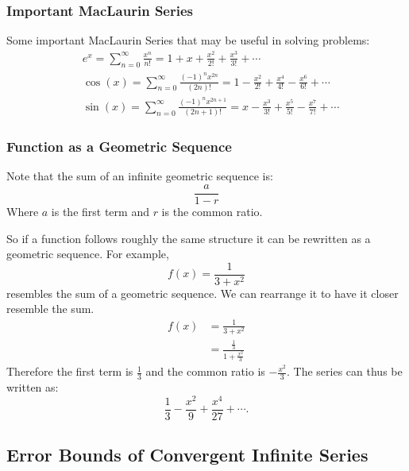 \documentclass[12pt]{article}
\begin{document}
\subsubsection{Important MacLaurin Series}
\noindent Some important MacLaurin Series that may be useful in solving problems:
\begin{align*}
     & e^x = \sum_{n=0}^\infty \frac{x^n}{n!} = 1 + x + \frac{x^2}{2!} + \frac{x^3}{3!} + \cdots                                   \\[6pt]
     & \cos(x) = \sum_{n=0}^\infty \frac{(-1)^n x^{2n}}{(2n)!} = 1 - \frac{x^2}{2!} + \frac{x^4}{4!} - \frac{x^6}{6!} + \cdots     \\[6pt]
     & \sin(x) = \sum_{n=0}^\infty \frac{(-1)^n x^{2n+1}}{(2n+1)!} = x - \frac{x^3}{3!} + \frac{x^5}{5!} - \frac{x^7}{7!} + \cdots
\end{align*}

\subsubsection{Function as a Geometric Sequence}
\noindent Note that the sum of an infinite geometric sequence is:
\[ \frac{a}{1-r} \]
Where $a$ is the first term and $r$ is the common ratio.

\noindent So if a function follows roughly the same structure it can be rewritten as a geometric sequence. For example,
\[ f(x) = \frac{1}{3+x^2} \]
resembles the sum of a geometric sequence. We can rearrange it to have it closer resemble the sum.
\begin{align*}
    f(x) & = \frac{1}{3+x^2}                       \\[6pt]
         & = \frac{\frac{1}{3}}{1 + \frac{x^2}{3}}
\end{align*}
Therefore the first term is $\frac{1}{3}$ and the common ratio is $-\frac{x^2}{3}$. The series can thus be written as:
\[ \frac{1}{3} - \frac{x^2}{9} + \frac{x^4}{27} + \cdots. \]

\subsection{Error Bounds of Convergent Infinite Series}
\end{document}
